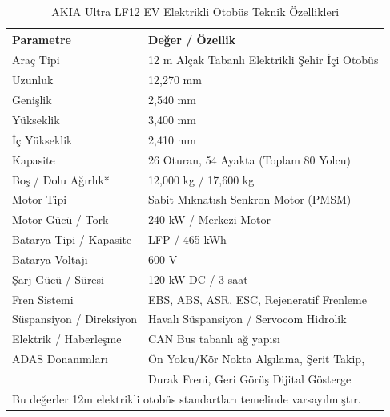 ﻿\documentclass[conference]{IEEEtran}
\begin{document}
\begin{table}[htbp]
\caption{AKIA Ultra LF12 EV Elektrikli Otobüs Teknik Özellikleri}
\label{tab:specs}
\centering
\footnotesize
\begin{tabular}{ll}
\toprule
\textbf{Parametre} & \textbf{Değer / Özellik} \\
\midrule
Araç Tipi & 12 m Alçak Tabanlı Elektrikli Şehir İçi Otobüs \\
Uzunluk & 12,270 mm \\
Genişlik & 2,540 mm \\
Yükseklik & 3,400 mm \\
İç Yükseklik & 2,410 mm \\
Kapasite & 26 Oturan, 54 Ayakta (Toplam 80 Yolcu) \\
Boş / Dolu Ağırlık* & 12,000 kg / 17,600 kg \\
Motor Tipi & Sabit Mıknatıslı Senkron Motor (PMSM) \\
Motor Gücü / Tork & 240 kW / Merkezi Motor \\
Batarya Tipi / Kapasite & LFP / 465 kWh \\
Batarya Voltajı & 600 V \\
Şarj Gücü / Süresi & 120 kW DC / 3 saat \\
Fren Sistemi & EBS, ABS, ASR, ESC, Rejeneratif Frenleme \\
Süspansiyon / Direksiyon & Havalı Süspansiyon / Servocom Hidrolik \\
Elektrik / Haberleşme & CAN Bus tabanlı ağ yapısı \\
ADAS Donanımları & Ön Yolcu/Kör Nokta Algılama, Şerit Takip, \\
& Durak Freni, Geri Görüş Dijital Gösterge \\
\bottomrule
\multicolumn{2}{l}{\small *Bu değerler 12m elektrikli otobüs standartları temelinde varsayılmıştır.} \\
\end{tabular}
\end{table}
\end{document}
